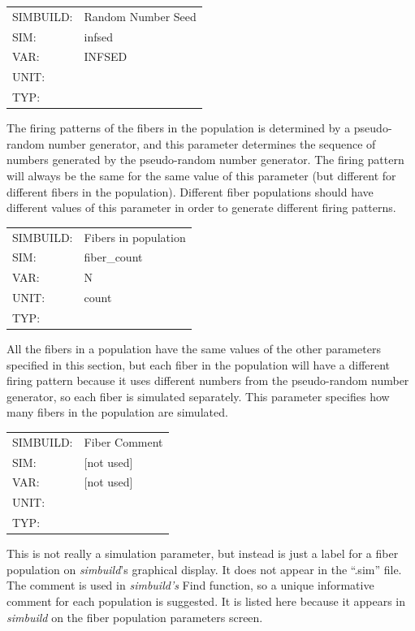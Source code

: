 \documentclass[12pt,openany,oneside]{book}
\newcommand{\prog}[1]{\textit{{#1}}}
\newcommand{\ext}[1]{{{``.#1''}}}
\begin{document}
\begin{flushleft}
\begin{tabular}{@{}ll@{}}
SIMBUILD: & Random Number Seed\\
SIM: & infsed\\
VAR: & INFSED\\
UNIT: &\\
TYP: &\\
\end{tabular}
\end{flushleft}
\noindent
The firing patterns of the fibers in the population is determined by a
pseudo-random number generator, and this parameter determines the
sequence of numbers generated by the pseudo-random number generator.
The firing pattern will always be the same for the same value of this
parameter (but different for different fibers in the population).
Different fiber populations should have different values of this
parameter in order to generate different firing patterns.
\filbreak
\vspace{\baselineskip}

\begin{flushleft}
\begin{tabular}{@{}ll@{}}
SIMBUILD: & Fibers in population\\
SIM: & fiber\_count\\
VAR: & N\\
UNIT: & count\\
TYP: &\\
\end{tabular}
\end{flushleft}
\noindent
All the fibers in a population have the same values of the other
parameters specified in this section, but each fiber in the population
will have a different firing pattern because it uses different numbers
from the pseudo-random number generator, so each fiber is simulated
separately. This parameter specifies how many fibers in the population
are simulated.
\filbreak
\vspace{\baselineskip}

\begin{flushleft}
\begin{tabular}{@{}ll@{}}
SIMBUILD: & Fiber Comment\\
SIM: & [not used]\\
VAR: & [not used]\\
UNIT: &\\
TYP: &\\
\end{tabular}
\end{flushleft}
\noindent
This is not really a simulation parameter, but instead is just a label for
a fiber population on \prog{simbuild}'s graphical display. It does not
appear in the \ext{sim} file.  The comment is used in \prog{simbuild's}
Find function, so a unique informative comment for each population is
suggested.  It is listed here because it appears in \prog{simbuild} on the
fiber population parameters screen.
\filbreak
\vspace{\baselineskip}
\end{document}
